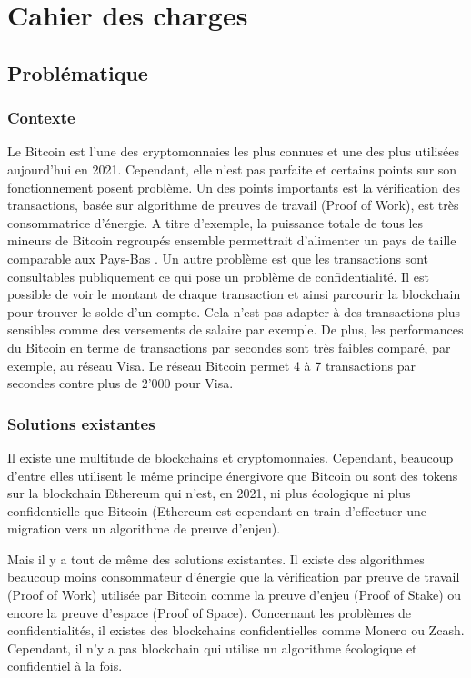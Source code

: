 \documentclass[../tb_report.tex]{subfiles}
\begin{document}
\chapter{Cahier des charges}

\section*{Problématique}

\subsection*{Contexte}

Le Bitcoin est l'une des cryptomonnaies les plus connues et une des plus utilisées aujourd'hui en 2021. Cependant, elle n'est pas parfaite et certains points sur son fonctionnement posent problème. Un des points importants est la vérification des transactions, basée sur algorithme de preuves de travail (Proof of Work), est très consommatrice d'énergie. A titre d'exemple, la puissance totale de tous les mineurs de Bitcoin regroupés ensemble permettrait d'alimenter un pays de taille comparable aux Pays-Bas \cite{BTC_cons}. Un autre problème est que les transactions sont consultables publiquement ce qui pose un problème de confidentialité. Il est possible de voir le montant de chaque transaction et ainsi parcourir la blockchain pour trouver le solde d'un compte. Cela n'est pas adapter à des transactions plus sensibles comme des versements de salaire par exemple. De plus, les performances du Bitcoin en terme de transactions par secondes sont très faibles comparé, par exemple, au réseau Visa. Le réseau Bitcoin permet 4 à 7 transactions par secondes contre plus de 2'000 pour Visa.

\subsection*{Solutions existantes}

Il existe une multitude de blockchains et cryptomonnaies. Cependant, beaucoup d'entre elles utilisent le même principe énergivore que Bitcoin ou sont des tokens sur la blockchain Ethereum qui n'est, en 2021, ni plus écologique ni plus confidentielle que Bitcoin (Ethereum est cependant en train d'effectuer une migration vers un algorithme de preuve d'enjeu).

Mais il y a tout de même des solutions existantes. Il existe des algorithmes beaucoup moins consommateur d'énergie que la vérification par preuve de travail (Proof of Work) utilisée par Bitcoin comme la preuve d'enjeu (Proof of Stake) ou encore la preuve d'espace (Proof of Space). Concernant les problèmes de confidentialités, il existes des blockchains confidentielles comme Monero ou Zcash. Cependant, il n'y a pas blockchain qui utilise un algorithme écologique et confidentiel à la fois.
\end{document}
